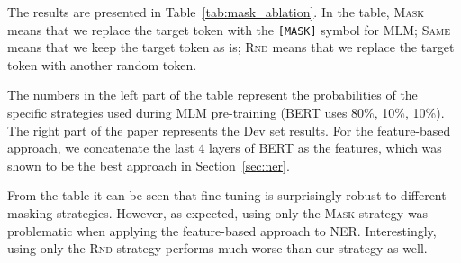 \documentclass[11pt,a4paper]{article}
\begin{document}
The results are presented in Table~\ref{tab:mask_ablation}. In the table,
 \textsc{Mask} means that we replace the target token with the {\tt [MASK]} symbol
for MLM; \textsc{Same} means that we keep the target token as is; \textsc{Rnd}
means that we replace the target token with another random token. 

The numbers in the left part of the table represent the probabilities of the specific strategies used during MLM pre-training (BERT uses 80\%, 10\%, 10\%). The right part of the paper represents the Dev set results. For the feature-based
approach, we concatenate the last 4 layers of BERT as the features, which
was shown to be the best approach in Section~\ref{sec:ner}.

From the table it can be seen that fine-tuning is surprisingly robust to
different masking strategies. However, as expected, using only the \textsc{Mask} strategy
was problematic when applying the feature-based approach to NER. Interestingly,
using only the \textsc{Rnd} strategy performs much worse than our strategy as well.
\end{document}
